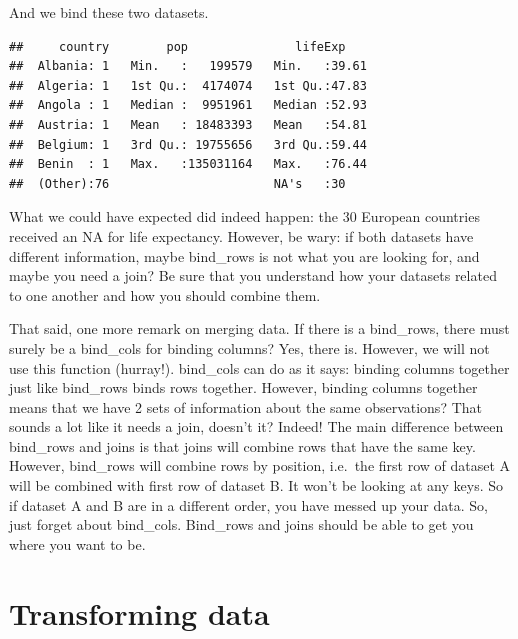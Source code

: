 \documentclass[]{tufte-book}
\newenvironment{Shaded}{}{}
\newcommand{\KeywordTok}[1]{\textcolor[rgb]{0.00,0.44,0.13}{\textbf{#1}}}
\newcommand{\NormalTok}[1]{#1}
\newcommand{\OperatorTok}[1]{\textcolor[rgb]{0.40,0.40,0.40}{#1}}
\newcommand{\StringTok}[1]{\textcolor[rgb]{0.25,0.44,0.63}{#1}}
\begin{document}
And we bind these two datasets.

\begin{Shaded}
\end{Shaded}

\begin{verbatim}
##     country        pop               lifeExp     
##  Albania: 1   Min.   :   199579   Min.   :39.61  
##  Algeria: 1   1st Qu.:  4174074   1st Qu.:47.83  
##  Angola : 1   Median :  9951961   Median :52.93  
##  Austria: 1   Mean   : 18483393   Mean   :54.81  
##  Belgium: 1   3rd Qu.: 19755656   3rd Qu.:59.44  
##  Benin  : 1   Max.   :135031164   Max.   :76.44  
##  (Other):76                       NA's   :30
\end{verbatim}

What we could have expected did indeed happen: the 30 European countries received an NA for life expectancy. However, be wary: if both datasets have different information, maybe bind\_rows is not what you are looking for, and maybe you need a join? Be sure that you understand how your datasets related to one another and how you should combine them.

That said, one more remark on merging data. If there is a bind\_rows, there must surely be a bind\_cols for binding columns? Yes, there is. However, we will not use this function (hurray!). bind\_cols can do as it says: binding columns together just like bind\_rows binds rows together. However, binding columns together means that we have 2 sets of information about the same observations? That sounds a lot like it needs a join, doesn't it? Indeed! The main difference between bind\_rows and joins is that joins will combine rows that have the same key. However, bind\_rows will combine rows by position, i.e.~the first row of dataset A will be combined with first row of dataset B. It won't be looking at any keys. So if dataset A and B are in a different order, you have messed up your data. So, just forget about bind\_cols. Bind\_rows and joins should be able to get you where you want to be.

\hypertarget{transforming-data-1}{%
\section{Transforming data}\label{transforming-data-1}}
\end{document}
